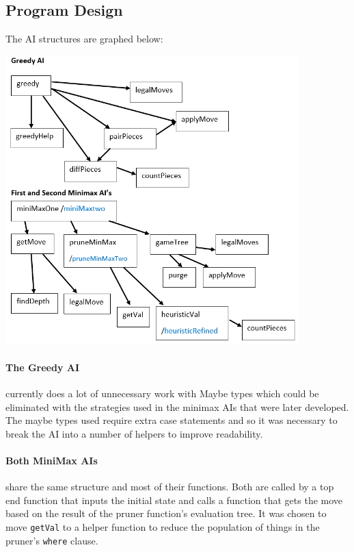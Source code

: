 \documentclass[11pt]{article}
\begin{document}
\newpage
\subsection*{Program Design}
The AI structures are graphed below:
\begin{center}
  \includegraphics[width=0.85\textwidth]{functDep.png}
\end{center}

\paragraph{The Greedy AI} currently does a lot of unnecessary work with Maybe types which could be eliminated with the strategies used in the minimax AIs that were later developed. The maybe types used require extra case statements and so it was necessary to break the AI into a number of helpers to improve readability.

\paragraph{Both MiniMax AIs} share the same structure and most of their functions. Both are called by a top end function that inputs the initial state and calls a function that gets the move based on the result of the pruner function's evaluation tree. It was chosen to move \verb|getVal| to a helper function to reduce the population of things in the pruner's \verb|where| clause.
\end{document}
